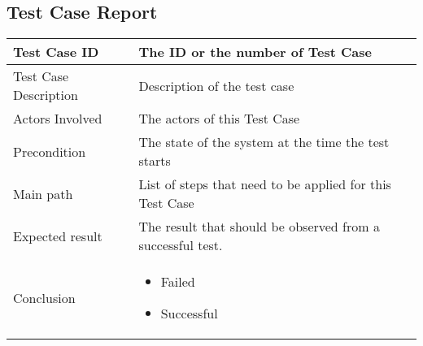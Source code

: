 \subsection{Test Case Report}
 \begin{center} \begin{tabular}{|l|l|}
  \hline
  Test Case ID& The ID or the number of Test Case\\
  \hline
  Test Case Description & Description of the test case\\
  \hline
  Actors Involved & The actors of this Test Case\\
   \hline
  Precondition & The state of the system at the time the test starts\\
  \hline
  Main path &  List of steps that need to be applied for this Test Case \\
  \hline
  Expected result & The result that should be observed from a successful test.\\
  \hline
  Conclusion & \begin{minipage}{5in}
    \vskip 4pt
               \begin{itemize}
                 \item Failed
                 \item Successful
               \end{itemize}

     \vskip 4pt
  \end{minipage}
  \\
  \hline
\end{tabular} \end{center}

